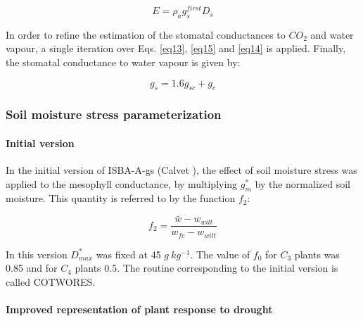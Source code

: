 {\begin{equation}\label{eq15}
E=\rho_{a}g_{s}^{first}D_{s}
\end{equation}

In order to refine the estimation of the stomatal conductances to $CO_{2}$ and water vapour, a single
iteration over Eqs. \ref{eq13}, \ref{eq15} and \ref{eq14} is applied. Finally, the stomatal conductance to water vapour is given
by:

\begin{equation}
g_{s} = 1.6g_{sc}+g_{c}
\end{equation}

\subsubsection{Soil moisture stress parameterization}
\label{sec1.4}

\paragraph{Initial version}

In the initial version of ISBA-A-gs (Calvet ), the effect of soil moisture stress was applied to
the mesophyll conductance, by multiplying $g_{m}^{*}$ by the normalized soil moisture. This quantity is
referred to by the function $f_{2}$:

\begin{equation}
f_{2} = \frac{\bar{w} - w_{wilt}}{w_{fc}-w_{wilt}}
\end{equation}


In this version $D_{max}^{\ast}$ was fixed at 45 $g ~kg^{-1}$. The
value of $f_{0}$ for $C_{3}$ plants was 0.85 and for $C_{4}$ plants
0.5.
The routine corresponding to the initial version is called COTWORES.

\paragraph{Improved representation of plant response to drought}

}
